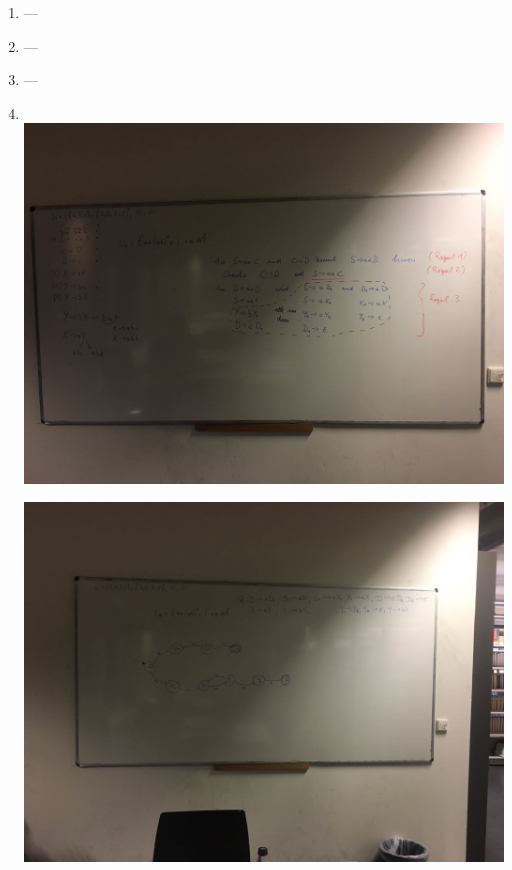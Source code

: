 \begin{enumerate}[1.]
  \item ---
  \item ---
  \item ---
  \item \ \\
    \includegraphics[width=\textwidth]{bilder/serie08_aufgabe4_1.jpg}

    \includegraphics[width=\textwidth]{bilder/serie08_aufgabe4_2.jpg}
\end{enumerate}

